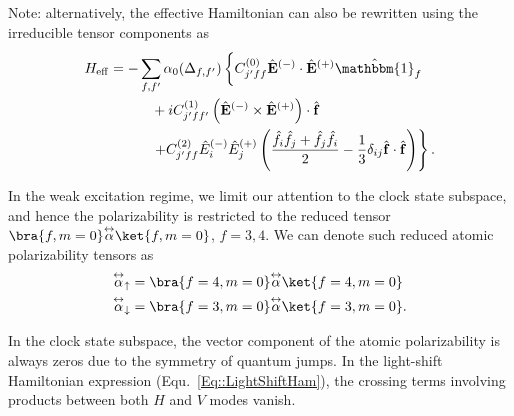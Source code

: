 \documentclass[]{report}
\newcommand{\tensor}[1]{\overset{\leftrightarrow}{#1}} %
\begin{document}
Note: alternatively, the effective Hamiltonian can also be rewritten using the irreducible tensor components as
\begin{align}  
H_{\rm eff} &= - \sum_{f,f'}\alpha_0(\Delta_{f,f'}) \left\{ C_{j'ff}^{(0)} \hat{\mathbf{E}}^{(-)} \cdot \hat{\mathbf{E}}^{(+)} \hat{\mathbbm{1}}_f \phantom{\frac{\hat{1}}{1}}\right. \nonumber\\
&\quad\quad\quad + i C_{j'ff'}^{(1)} \left(\hat{\mathbf{E}}^{(-)} \times \hat{\mathbf{E}}^{(+)} \right) \cdot \hat{ \mathbf{f}} \nonumber\\
&\quad\quad\quad  \left. + C_{j'ff}^{(2)} \hat{E}_i^{(-)} \hat{E}_j^{(+)} \left( \frac{ \hat{f}_i \hat{f}_j  + \hat{f}_j \hat{f}_i  }{2} - \frac{1}{3}\delta_{ij} \hat{ \mathbf{f}} \cdot \hat{\mathbf{f}}  \right) \right\}. \label{Eq::LightShiftHam_irep}
\end{align} 

In the weak excitation regime, we limit our attention to the clock state subspace, and hence the polarizability is restricted to the reduced tensor $ \bra{f,m=0}\tensor{\alpha}\ket{f,m=0}$, $f=3,4 $. We can denote such reduced atomic polarizability tensors as 
\begin{align}
\tensor{\alpha}_{\uparrow} &=\bra{f=4,m=0}\tensor{\alpha}\ket{f=4,m=0}\\
\tensor{\alpha}_{\downarrow} &=\bra{f=3,m=0}\tensor{\alpha}\ket{f=3,m=0}.
\end{align}


In the clock state subspace, the vector component of the atomic polarizability is always zeros due to the symmetry of quantum jumps. In the light-shift Hamiltonian expression (Equ.~\eqref{Eq::LightShiftHam}), the crossing terms involving products between both $ H $ and $ V $ modes vanish. 
\end{document}

